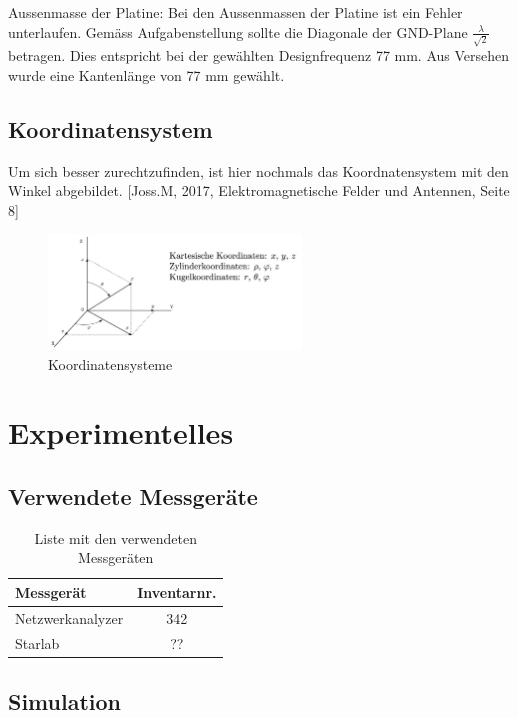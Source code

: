 Aussenmasse der Platine: Bei den Aussenmassen der Platine ist ein Fehler unterlaufen. Gemäss Aufgabenstellung sollte die Diagonale der GND-Plane $\frac{\lambda}{\sqrt{2}}$ betragen. Dies entspricht bei der gewählten Designfrequenz 77 mm. Aus Versehen wurde eine Kantenlänge von 77 mm gewählt.\\

\subsection{Koordinatensystem}
Um sich besser zurechtzufinden, ist hier nochmals das Koordnatensystem mit den Winkel abgebildet. [Joss.M, 2017, Elektromagnetische Felder und Antennen, Seite 8]

\begin{figure}[htbp]
	\centering
	\includegraphics[width=0.6\textwidth]{pic/Koordinatensysteme.JPG}
	\caption{Koordinatensysteme}
	\label{fig:Koordinatensysteme}
\end{figure}


\section{Experimentelles}

\subsection{Verwendete Messgeräte}
\begin{table}[h] 
	\centering
	\begin{tabular}{l|c}
		Messgerät & Inventarnr.\\
		\hline\hline
		Netzwerkanalyzer & 342  \\
		Starlab & ??  \\
	
	\end{tabular}
	\caption{Liste mit den verwendeten Messgeräten}
	\label{ListeMessgeraete}
\end{table}

\subsection{Simulation}

